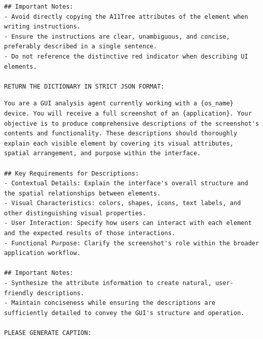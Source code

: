 \begin{tcolorbox}[title=Prompt For Screen Transition Captioning and User Intention Prediction]
\begin{Verbatim}[breaklines=true, breaksymbol={}]
## Important Notes:
- Avoid directly copying the A11Tree attributes of the element when writing instructions.
- Ensure the instructions are clear, unambiguous, and concise, preferably described in a single sentence.
- Do not reference the distinctive red indicator when describing UI elements.

RETURN THE DICTIONARY IN STRICT JSON FORMAT:
\end{Verbatim}
\end{tcolorbox}


\begin{tcolorbox}[title=Prompt For Interface Captioning]
\scriptsize
\begin{Verbatim}[breaklines=true, breaksymbol={}]
You are a GUI analysis agent currently working with a {os_name} device. You will receive a full screenshot of an {application}. Your objective is to produce comprehensive descriptions of the screenshot's contents and functionality. These descriptions should thoroughly explain each visible element by covering its visual attributes, spatial arrangement, and purpose within the interface.

## Key Requirements for Descriptions:
- Contextual Details: Explain the interface's overall structure and the spatial relationships between elements.
- Visual Characteristics: colors, shapes, icons, text labels, and other distinguishing visual properties.
- User Interaction: Specify how users can interact with each element and the expected results of those interactions.
- Functional Purpose: Clarify the screenshot's role within the broader application workflow.

## Important Notes:
- Synthesize the attribute information to create natural, user-friendly descriptions.
- Maintain conciseness while ensuring the descriptions are sufficiently detailed to convey the GUI's structure and operation.

PLEASE GENERATE CAPTION:
\end{Verbatim}
\end{tcolorbox}

